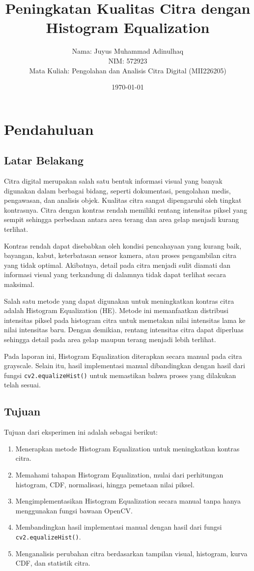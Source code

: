 \documentclass[12pt,a4paper]{article}
\title{\textbf{Peningkatan Kualitas Citra dengan Histogram Equalization}}
\author{
    Nama: Juyus Muhammad Adinulhaq\\
    NIM: 572923\\
    Mata Kuliah: Pengolahan dan Analisis Citra Digital (MII226205)
}
\date{\today}
\begin{document}
\maketitle
\tableofcontents
\newpage

\section{Pendahuluan}

\subsection{Latar Belakang}
Citra digital merupakan salah satu bentuk informasi visual yang banyak digunakan dalam berbagai bidang, seperti dokumentasi, pengolahan medis, pengawasan, dan analisis objek. Kualitas citra sangat dipengaruhi oleh tingkat kontrasnya. Citra dengan kontras rendah memiliki rentang intensitas piksel yang sempit sehingga perbedaan antara area terang dan area gelap menjadi kurang terlihat.

Kontras rendah dapat disebabkan oleh kondisi pencahayaan yang kurang baik, bayangan, kabut, keterbatasan sensor kamera, atau proses pengambilan citra yang tidak optimal. Akibatnya, detail pada citra menjadi sulit diamati dan informasi visual yang terkandung di dalamnya tidak dapat terlihat secara maksimal.

Salah satu metode yang dapat digunakan untuk meningkatkan kontras citra adalah Histogram Equalization (HE). Metode ini memanfaatkan distribusi intensitas piksel pada histogram citra untuk memetakan nilai intensitas lama ke nilai intensitas baru. Dengan demikian, rentang intensitas citra dapat diperluas sehingga detail pada area gelap maupun terang menjadi lebih terlihat.

Pada laporan ini, Histogram Equalization diterapkan secara manual pada citra grayscale. Selain itu, hasil implementasi manual dibandingkan dengan hasil dari fungsi \texttt{cv2.equalizeHist()} untuk memastikan bahwa proses yang dilakukan telah sesuai.

\subsection{Tujuan}
Tujuan dari eksperimen ini adalah sebagai berikut:

\begin{enumerate}
    \item Menerapkan metode Histogram Equalization untuk meningkatkan kontras citra.
    \item Memahami tahapan Histogram Equalization, mulai dari perhitungan histogram, CDF, normalisasi, hingga pemetaan nilai piksel.
    \item Mengimplementasikan Histogram Equalization secara manual tanpa hanya menggunakan fungsi bawaan OpenCV.
    \item Membandingkan hasil implementasi manual dengan hasil dari fungsi \texttt{cv2.equalizeHist()}.
    \item Menganalisis perubahan citra berdasarkan tampilan visual, histogram, kurva CDF, dan statistik citra.
\end{enumerate}
\end{document}
